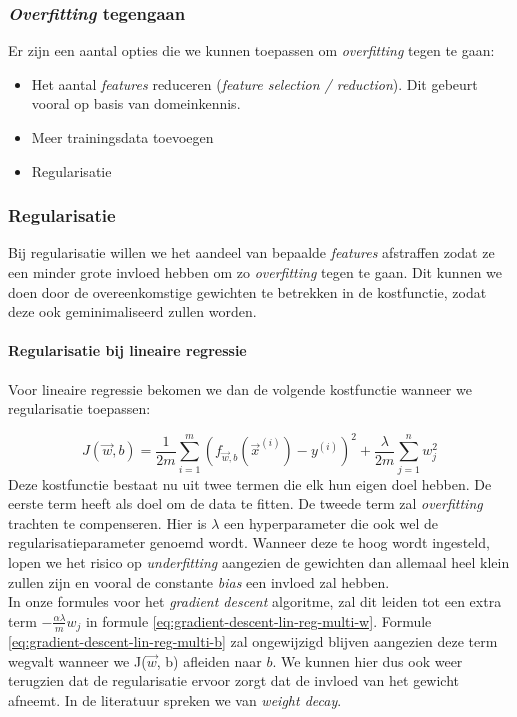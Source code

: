 \subsubsection{\textit{Overfitting} tegengaan}

Er zijn een aantal opties die we kunnen toepassen om \textit{overfitting} tegen te gaan:
\begin{itemize}
	\item Het aantal \textit{features} reduceren (\textit{feature selection / reduction}). Dit gebeurt vooral op basis van domeinkennis.
	\item Meer trainingsdata toevoegen
	\item Regularisatie
\end{itemize}

\subsubsection{Regularisatie}

Bij regularisatie willen we het aandeel van bepaalde \textit{features} afstraffen zodat ze een minder grote invloed hebben om zo \textit{overfitting} tegen te gaan. Dit kunnen we doen door de overeenkomstige gewichten te betrekken in de kostfunctie, zodat deze ook geminimaliseerd zullen worden. 

\paragraph{Regularisatie bij lineaire regressie}

Voor lineaire regressie bekomen we dan de volgende kostfunctie wanneer we regularisatie toepassen:

\begin{equation}
	J(\vec{w}, b) = \frac{1}{2m} \sum_{i=1}^{m} (f_{\vec{w},b}(\vec{x}^{(i)}) - y^{(i)})^{2} + \frac{\lambda}{2m} \sum_{j=1}^{n} w_{j}^{2}
	\label{eq:cost-function-lin-regul}
\end{equation}
\noindent
Deze kostfunctie bestaat nu uit twee termen die elk hun eigen doel hebben. De eerste term heeft als doel om de data te fitten. De tweede term zal \textit{overfitting} trachten te compenseren. Hier is $\lambda$ een hyperparameter die ook wel de regularisatieparameter genoemd wordt. Wanneer deze te hoog wordt ingesteld, lopen we het risico op \textit{underfitting} aangezien de gewichten dan allemaal heel klein zullen zijn en vooral de constante \textit{bias} een invloed zal hebben. \\
\newline
In onze formules voor het \textit{gradient descent} algoritme, zal dit leiden tot een extra term $-\frac{\alpha \lambda}{m} w_{j}$ in formule \ref{eq:gradient-descent-lin-reg-multi-w}. Formule \ref{eq:gradient-descent-lin-reg-multi-b} zal ongewijzigd blijven aangezien deze term wegvalt wanneer we J($\vec{w}$, b) afleiden naar $b$. We kunnen hier dus ook weer terugzien dat de regularisatie ervoor zorgt dat de invloed van het gewicht afneemt. In de literatuur spreken we van \textit{weight decay}. 

